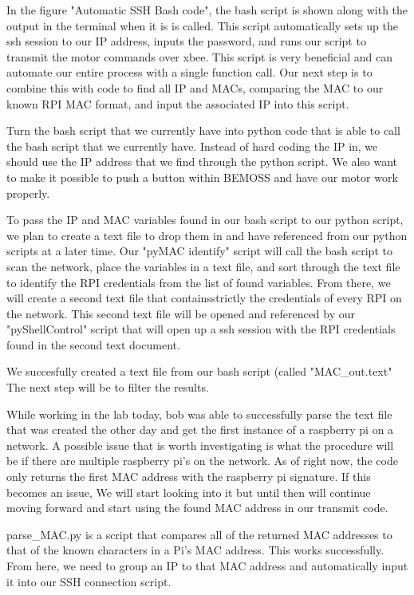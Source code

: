 \documentclass[fontsize=11pt, %
                             paper=letter, %
                             twoside, %
                             captions=tableheading,
                             index=totoc,
                             hyperref]{labbook}
\begin{document}
In the figure "Automatic SSH Bash code", the bash script is shown along with the output in the terminal when it is is called. This script automatically sets up the ssh session to our IP address, inputs the password, and runs our script to transmit the motor commands over xbee. This script is very beneficial and can automate our entire process with a single function call. Our next step is to combine this with code to find all IP and MACs, comparing the MAC to our known RPI MAC format, and input the associated IP into this script. 


Turn the bash script that we currently have into python code that is able to call the bash script that we currently have. Instead of hard coding the IP in, we should use the IP address that we find through the python script.
We also want to make it possible to push a button within BEMOSS and have our motor work properly.

To pass the IP and MAC variables found in our bash script to our python script, we plan to create a text file to drop them in and have referenced from our python scripts at a later time. Our "pyMAC identify" script will call the bash script to scan the network, place the variables in a text file, and sort through the text file to identify the RPI credentials from the list of found variables. From there, we will create a second text file that containsstrictly the credentials of every RPI on the network. This second text file will be opened and referenced by our "pyShellControl" script that will open up a ssh session with the RPI credentials found in the second text document. 

We succesfully created a text file from our bash script (called "MAC\_out.text" The next step will be to filter the results. 

While working in the lab today, bob was able to successfully parse the text file that was created the other day and get the first instance of a raspberry pi on a network. A possible issue that is worth investigating is what the procedure will be if there are multiple raspberry pi's on the network. As of right now, the code only returns the first MAC address with the raspberry pi signature. If this becomes an issue, We will start looking into it but until then will continue moving forward and start using the found MAC address in our transmit code.

parse\_MAC.py is a script that compares all of the returned MAC addresses to that of the known characters in a Pi's MAC address. This works successfully. From here, we need to group an IP to that MAC address and automatically input it into our SSH connection script. 
\end{document}
